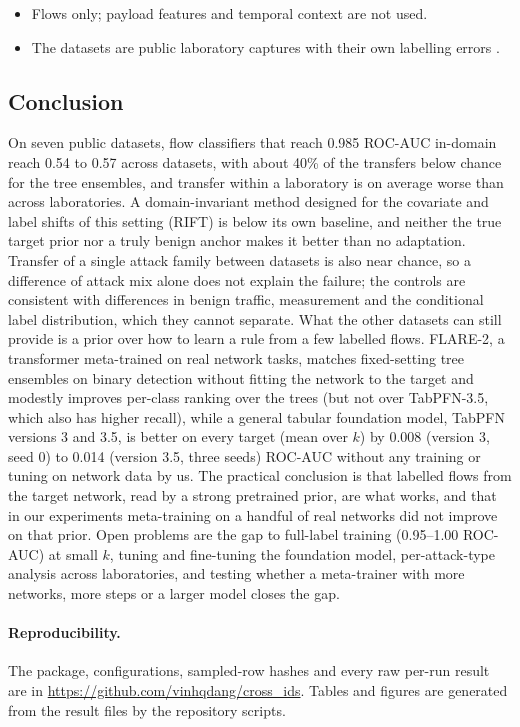 \documentclass[pdflatex,sn-mathphys-num]{sn-jnl}%
\begin{document}
\begin{itemize}
\item Flows only; payload features and temporal context are not used.
\item The datasets are public laboratory captures with their own labelling errors \citep{engelen2021troubleshooting}.
\end{itemize}

\subsection{Conclusion}
On seven public datasets, flow classifiers that reach 0.985 ROC-AUC in-domain reach 0.54 to 0.57 across datasets, with about 40\% of the transfers below chance for the tree ensembles, and transfer within a laboratory is on average worse than across laboratories.
A domain-invariant method designed for the covariate and label shifts of this setting (RIFT) is below its own baseline, and neither the true target prior nor a truly benign anchor makes it better than no adaptation.
Transfer of a single attack family between datasets is also near chance, so a difference of attack mix alone does not explain the failure; the controls are consistent with differences in benign traffic, measurement and the conditional label distribution, which they cannot separate.
What the other datasets can still provide is a prior over how to learn a rule from a few labelled flows.
FLARE-2, a transformer meta-trained on real network tasks, matches fixed-setting tree ensembles on binary detection without fitting the network to the target and modestly improves per-class ranking over the trees (but not over TabPFN-3.5, which also has higher recall), while a general tabular foundation model, TabPFN versions 3 and 3.5, is better on every target (mean over $k$) by 0.008 (version 3, seed 0) to 0.014 (version 3.5, three seeds) ROC-AUC without any training or tuning on network data by us.
The practical conclusion is that labelled flows from the target network, read by a strong pretrained prior, are what works, and that in our experiments meta-training on a handful of real networks did not improve on that prior.
Open problems are the gap to full-label training (0.95--1.00 ROC-AUC) at small $k$, tuning and fine-tuning the foundation model, per-attack-type analysis across laboratories, and testing whether a meta-trainer with more networks, more steps or a larger model closes the gap.

\paragraph{Reproducibility.}
The package, configurations, sampled-row hashes and every raw per-run result are in \url{https://github.com/vinhqdang/cross_ids}. Tables and figures are generated from the result files by the repository scripts.
\end{document}
